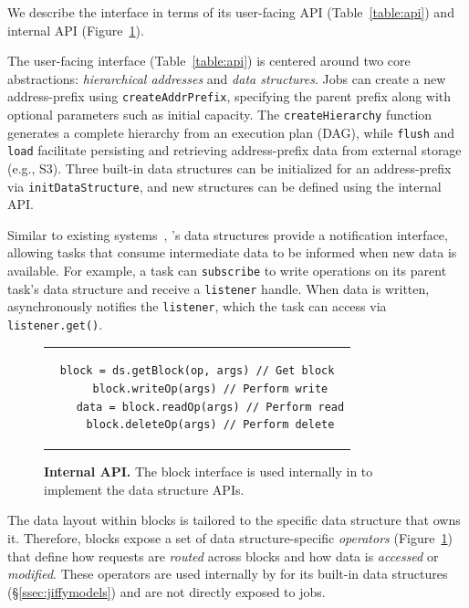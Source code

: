 We describe the \jiffy interface in terms of its user-facing API (Table~\ref{table:api}) and internal API (Figure~\ref{fig:blockapi}).

 The user-facing interface (Table~\ref{table:api}) is centered around two core abstractions: \textit{hierarchical addresses} and \textit{data structures}. Jobs can create a new address-prefix using \texttt{createAddrPrefix}, specifying the parent prefix along with optional parameters such as initial capacity. The \texttt{createHierarchy} function generates a complete hierarchy from an execution plan (DAG), while \texttt{flush} and \texttt{load} facilitate persisting and retrieving address-prefix data from external storage (e.g., S3). Three built-in data structures can be initialized for an address-prefix via \texttt{initDataStructure}, and new structures can be defined using the internal API.

Similar to existing systems~\cite{redis, sns}, \jiffy’s data structures provide a notification interface, allowing tasks that consume intermediate data to be informed when new data is available. For example, a task can \texttt{subscribe} to write operations on its parent task’s data structure and receive a \texttt{listener} handle. When data is written, \jiffy asynchronously notifies the \texttt{listener}, which the task can access via \texttt{listener.get()}.


\begin{figure}[h]
  \centering
  \begin{tabular}{c}
  {\begin{lstlisting}[frame=single, gobble=4, linewidth=20em]
    block = ds.getBlock(op, args) // Get block
    block.writeOp(args) // Perform write
    data = block.readOp(args) // Perform read
    block.deleteOp(args) // Perform delete
  \end{lstlisting}}
  \end{tabular}
  \caption[\jiffy Internal API]{\textbf{\jiffy Internal API.} The block interface is used internally in \jiffy to implement the data structure APIs.}  
  \label{fig:blockapi}
\end{figure}

 The data layout within \jiffy blocks is tailored to the specific data structure that owns it. Therefore, \jiffy blocks expose a set of data structure-specific \textit{operators} (Figure~\ref{fig:blockapi}) that define how requests are \textit{routed} across blocks and how data is \textit{accessed} or \textit{modified}. These operators are used internally by \jiffy for its built-in data structures (\S\ref{ssec:jiffymodels}) and are not directly exposed to jobs.

